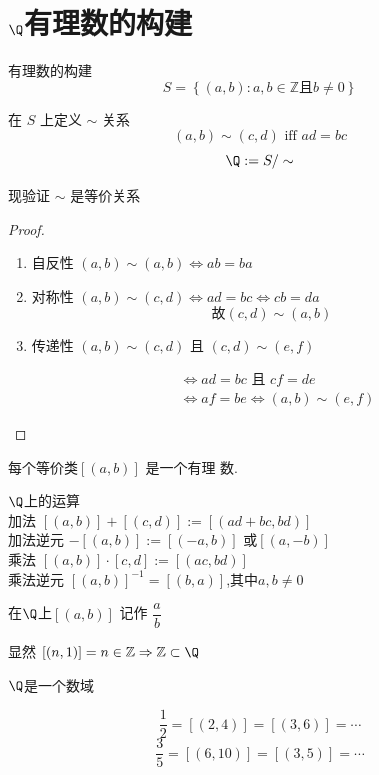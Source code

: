 \section{$\Q$有理数的构建}
\begin{construction}有理数的构建
	$$
	S=\left\{(a, b): a, b \in \mathbb{Z}\text{且}b\ne0\right\}
	$$
	
	
	在 $S$ 上定义 $\sim$ 关系
	\[(a, b) \sim(c, d) \text { iff } a d=b c\]
	\[\Q:=S/\sim\]
	
\end{construction}



现验证 $\sim$ 是等价关系
\begin{proof}
	\begin{enumerate}
		\item 自反性 $(a, b) \sim(a, b) \Leftrightarrow a b=b a$
		\item   对称性 $(a, b) \sim ( c, d) \Leftrightarrow a d=b c \Leftrightarrow c b=d a$
		\[\text{故}(c, d) \sim(a, b)\]
		
		\item  传递性 $(a, b) \sim(c, d)$ 且 $(c, d) \sim(e, f)$
		
		$$
		\begin{aligned}
			& \Leftrightarrow a d=b c \text { 且 } c f=d e \\
			& \Leftrightarrow a f=b e \Leftrightarrow(a, b) \sim(e, f)
		\end{aligned}
		$$
		
	\end{enumerate}
\end{proof}
每个等价类$[(a, b)]$ 是一个有理 数.

\begin{definition}$\Q$上的运算\\
	加法 $[(a, b)]+[(c, d)]:=[( a d+b c, b d)]$\\
	加法逆元 $-[(a, b)]:=[(-a, b)]$ 或$[(a,-b)]$\\
	乘法 $[(a, b)] \cdot[c, d]:=[(a c, b d)]$\\
	乘法逆元 $[(a, b)]^{-1}=[(b, a)]$,其中$a,b\ne0$
\end{definition}

在$\Q$上$[(a, b)]$ 记作 $\dfrac{a}{b} \quad$


显然 $[(n, 1)]=n \in \mathbb{Z} \Rightarrow \mathbb{Z} \subset\Q$

$\Q$是一个数域

\begin{example}
	$$\dfrac{1}{2}=[(2,4)]=[(3,6)]=\cdots$$
	$$\dfrac{3}{5}=[(6,10)]=[(3,5)]=\cdots$$
\end{example}

